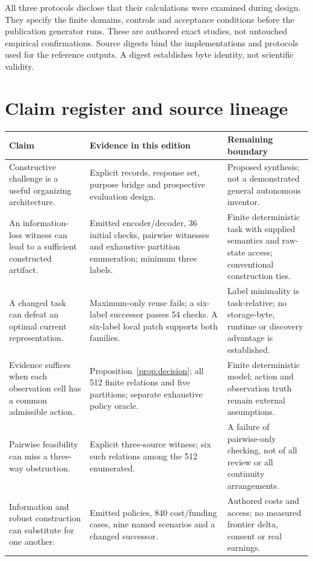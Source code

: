 All three protocols disclose that their calculations were examined during design. They specify the finite domains, controls and acceptance conditions before the publication generator runs. These are authored exact studies, not untouched empirical confirmations. Source digests bind the implementations and protocols used for the reference outputs. A digest establishes byte identity, not scientific validity.

\section{Claim register and source lineage}
\label{app:claims}
\begin{longtable}{P{1.55in}P{2.32in}P{2.05in}}
\toprule
\textbf{Claim} & \textbf{Evidence in this edition} & \textbf{Remaining boundary}\\
\midrule\endhead
Constructive challenge is a useful organizing architecture. & Explicit records, response set, purpose bridge and prospective evaluation design. & Proposed synthesis; not a demonstrated general autonomous inventor.\\
An information-loss witness can lead to a sufficient constructed artifact. & Emitted encoder/decoder, 36 initial checks, pairwise witnesses and exhaustive partition enumeration; minimum three labels. & Finite deterministic task with supplied semantics and raw-state access; conventional construction ties.\\
A changed task can defeat an optimal current representation. & Maximum-only reuse fails; a six-label successor passes 54 checks. A six-label local patch supports both families. & Label minimality is task-relative; no storage-byte, runtime or discovery advantage is established.\\
Evidence suffices when each observation cell has a common admissible action. & Proposition~\ref{prop:decision}; all 512 finite relations and five partitions; separate exhaustive policy oracle. & Finite deterministic model; action and observation truth remain external assumptions.\\
Pairwise feasibility can miss a three-way obstruction. & Explicit three-source witness; six such relations among the 512 enumerated. & A failure of pairwise-only checking, not of all review or all continuity arrangements.\\
Information and robust construction can substitute for one another. & Emitted policies, 840 cost/funding cases, nine named scenarios and a changed successor. & Authored costs and access; no measured frontier delta, consent or real earnings.\\

\end{longtable}
